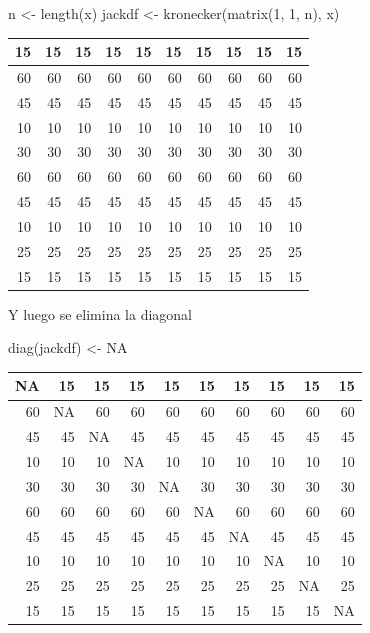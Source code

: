 \documentclass[
  12pt,
]{book}
\newenvironment{Shaded}{\begin{snugshade}}{\end{snugshade}}
\newcommand{\ConstantTok}[1]{\textcolor[rgb]{0.00,0.00,0.00}{#1}}
\newcommand{\DecValTok}[1]{\textcolor[rgb]{0.00,0.00,0.81}{#1}}
\newcommand{\FunctionTok}[1]{\textcolor[rgb]{0.00,0.00,0.00}{#1}}
\newcommand{\NormalTok}[1]{#1}
\newcommand{\OtherTok}[1]{\textcolor[rgb]{0.56,0.35,0.01}{#1}}
\theoremstyle{definition}
\theoremstyle{definition}
\theoremstyle{definition}
\theoremstyle{definition}
\theoremstyle{remark}
\begin{document}
\begin{Shaded}
\begin{Highlighting}[]
\NormalTok{n }\OtherTok{\textless{}{-}} \FunctionTok{length}\NormalTok{(x)}
\NormalTok{jackdf }\OtherTok{\textless{}{-}} \FunctionTok{kronecker}\NormalTok{(}\FunctionTok{matrix}\NormalTok{(}\DecValTok{1}\NormalTok{, }\DecValTok{1}\NormalTok{, n), x)}
\end{Highlighting}
\end{Shaded}

\begin{tabular}{r|r|r|r|r|r|r|r|r|r}
\hline
15 & 15 & 15 & 15 & 15 & 15 & 15 & 15 & 15 & 15\\
\hline
60 & 60 & 60 & 60 & 60 & 60 & 60 & 60 & 60 & 60\\
\hline
45 & 45 & 45 & 45 & 45 & 45 & 45 & 45 & 45 & 45\\
\hline
10 & 10 & 10 & 10 & 10 & 10 & 10 & 10 & 10 & 10\\
\hline
30 & 30 & 30 & 30 & 30 & 30 & 30 & 30 & 30 & 30\\
\hline
60 & 60 & 60 & 60 & 60 & 60 & 60 & 60 & 60 & 60\\
\hline
45 & 45 & 45 & 45 & 45 & 45 & 45 & 45 & 45 & 45\\
\hline
10 & 10 & 10 & 10 & 10 & 10 & 10 & 10 & 10 & 10\\
\hline
25 & 25 & 25 & 25 & 25 & 25 & 25 & 25 & 25 & 25\\
\hline
15 & 15 & 15 & 15 & 15 & 15 & 15 & 15 & 15 & 15\\
\hline
\end{tabular}

Y luego se elimina la diagonal

\begin{Shaded}
\begin{Highlighting}[]
\FunctionTok{diag}\NormalTok{(jackdf) }\OtherTok{\textless{}{-}} \ConstantTok{NA}
\end{Highlighting}
\end{Shaded}

\begin{tabular}{r|r|r|r|r|r|r|r|r|r}
\hline
NA & 15 & 15 & 15 & 15 & 15 & 15 & 15 & 15 & 15\\
\hline
60 & NA & 60 & 60 & 60 & 60 & 60 & 60 & 60 & 60\\
\hline
45 & 45 & NA & 45 & 45 & 45 & 45 & 45 & 45 & 45\\
\hline
10 & 10 & 10 & NA & 10 & 10 & 10 & 10 & 10 & 10\\
\hline
30 & 30 & 30 & 30 & NA & 30 & 30 & 30 & 30 & 30\\
\hline
60 & 60 & 60 & 60 & 60 & NA & 60 & 60 & 60 & 60\\
\hline
45 & 45 & 45 & 45 & 45 & 45 & NA & 45 & 45 & 45\\
\hline
10 & 10 & 10 & 10 & 10 & 10 & 10 & NA & 10 & 10\\
\hline
25 & 25 & 25 & 25 & 25 & 25 & 25 & 25 & NA & 25\\
\hline
15 & 15 & 15 & 15 & 15 & 15 & 15 & 15 & 15 & NA\\
\hline
\end{tabular}
\end{document}
